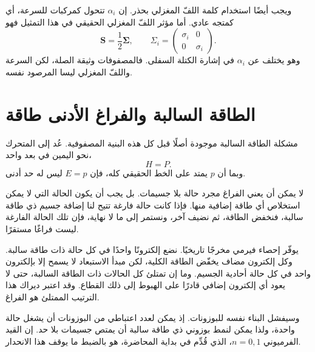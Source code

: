 \begin{classroomqa}
\end{classroomqa}

ويجب أيضًا استخدام كلمة اللفّ المغزلي بحذر. إن \(\alpha_i\) تتحول كمركبات للسرعة، أي كمتجه عادي. أما مؤثر اللفّ المغزلي الحقيقي في هذا التمثيل فهو
\begin{equation}
\mathbf S=\frac12\boldsymbol{\Sigma},
\qquad
\Sigma_i=
\begin{pmatrix}
\sigma_i&0\\
0&\sigma_i
\end{pmatrix}.
\label{eq:l10-spin-operator}
\end{equation}
وهو يختلف عن \(\alpha_i\) في إشارة الكتلة السفلى. فالمصفوفات وثيقة الصلة، لكن السرعة واللفّ المغزلي ليسا المرصود نفسه.

\section{الطاقة السالبة والفراغ الأدنى طاقة}

مشكلة الطاقة السالبة موجودة أصلًا قبل كل هذه البنية المصفوفية. عُد إلى المتحرك نحو اليمين في بعد واحد،
\begin{equation}
H=P.
\end{equation}
وبما أن \(p\) يمتد على الخط الحقيقي كله، فإن \(E=p\) ليس له حد أدنى.

لا يمكن أن يعني الفراغ مجرد حالة بلا جسيمات. بل يجب أن يكون الحالة التي لا يمكن استخلاص أي طاقة إضافية منها. فإذا كانت حالة فارغة تتيح لنا إضافة جسيم ذي طاقة سالبة، فنخفض الطاقة، ثم نضيف آخر، ونستمر إلى ما لا نهاية، فإن تلك الحالة الفارغة ليست فراغًا مستقرًا.

يوفّر إحصاء فيرمي مخرجًا تاريخيًا. نضع إلكترونًا واحدًا في كل حالة ذات طاقة سالبة. وكل إلكترون مضاف يخفّض الطاقة الكلية، لكن مبدأ الاستبعاد لا يسمح إلا بإلكترون واحد في كل حالة أحادية الجسيم. وما إن تمتلئ كل الحالات ذات الطاقة السالبة، حتى لا يعود أي إلكترون إضافي قادرًا على الهبوط إلى ذلك القطاع. وقد اعتبر ديراك هذا الترتيب الممتلئ هو الفراغ.

وسيفشل البناء نفسه للبوزونات. إذ يمكن لعدد اعتباطي من البوزونات أن يشغل حالة واحدة، ولذا يمكن لنمط بوزوني ذي طاقة سالبة أن يمتص جسيمات بلا حد. إن القيد الفرميوني \(n=0,1\)، الذي قُدِّم في بداية المحاضرة، هو بالضبط ما يوقف هذا الانحدار.

